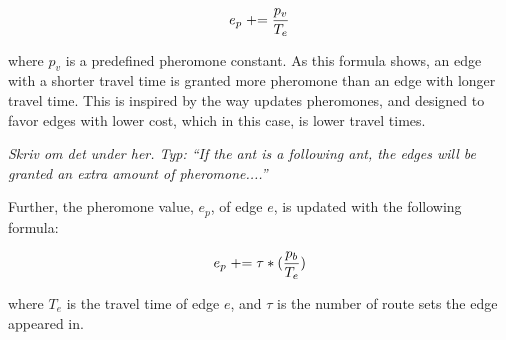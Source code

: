 $$e_p \mathrel{+}= \frac{p_v}{T_e}$$ 

where $p_v$ is a predefined pheromone constant. As this formula shows, an edge with a shorter travel time is granted more pheromone than an edge with longer travel time. This is inspired by the way \citet{hsiao04} updates pheromones, and designed to favor edges with lower cost, which in this case, is lower travel times. 

\emph{\color{blue}Skriv om det under her. Typ: ``If the ant is a following ant, the edges will be granted an extra amount of pheromone....''}

Further, the pheromone value, $e_p$, of edge $e$, is updated with the following formula:

$$e_p \mathrel{+}= \tau*(\frac{p_b}{T_e})$$ 

where $T_e$ is the travel time of edge $e$, and $\tau$ is the number of route sets the edge appeared in. 


